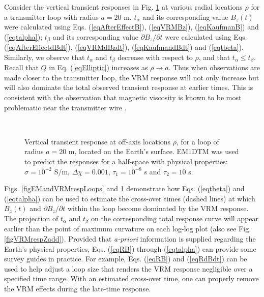 \documentclass[journal]{IEEEtran}  %
\begin{document}
Consider the vertical transient responses in Fig.
\ref{figEMandVRMrespOffAxis} at various radial locations $\rho$ for
a transmitter loop with radius $a=20$ m. $t_{\alpha}$ and its
corresponding value $B_z(t)$ were calculated using Eqs.
(\ref{eqAfterEffectB}), (\ref{eqVRMBz}), (\ref{eqKaufmanB}) and
(\ref{eqtalpha}); $t_{\beta}$ and its corresponding value $\partial
B_z/\partial t$ were calculated using Eqs.
(\ref{eqAfterEffectdBdt}), (\ref{eqVRMdBzdt}), (\ref{eqKaufmandBdt})
and (\ref{eqtbeta}). Similarly, we observe that $t_\alpha$ and
$t_\beta$ decrease with respect to $\rho$, and that $t_\alpha \leq
t_\beta$. Recall that $Q$ in Eq. (\ref{eqElliptic})
increases as $\rho \rightarrow a$. Thus when observations are made closer
to the transmitter loop, the VRM response will not only increase but will
also dominate the total observed transient response at earlier
times. This is consistent with the observation that magnetic
viscosity is known to be most problematic near the transmitter wire
\cite{Buselli1982,Lee1984,Barsukov2001}.

%
\begin{figure}[!t]
    \centering
    \\
    \vspace{-10pt}
    \caption{Vertical transient response at off-axis locations $\rho$,
    for a loop of radius $a=20$ m, located on the Earth's surface.
    EM1DTM was used to predict the responses for a half-space with
    physical properties: $\sigma=10^{-2}$ S/m, $\Delta \chi=0.001$, $\tau_1=10^{-8}$ s and $\tau_2=10$ s.}
    \label{figEMandVRMrespOffAxis}
\end{figure}
%

Figs. \ref{figEMandVRMrespLoops} and
\ref{figEMandVRMrespOffAxis} demonstrate how Eqs. (\ref{eqtbeta})
and (\ref{eqtalpha}) can be used to estimate the cross-over times
(dashed lines) at which $B_z (t)$ and $\partial B_z /\partial t$
within the loop become dominated by the VRM response. 
The projection of $t_\alpha$ and $t_\beta$ on the corresponding
total response curve will appear earlier than the point of maximum
curvature on each log-log plot (also see Fig. \ref{figVRMrespZadd}).
Provided that {\it a-priori} information is supplied regarding the
Earth's physical properties, Eqs. (\ref{eqRB}) through
(\ref{eqtalpha}) can provide some survey guides in practice. For
example, Eqs. (\ref{eqRB}) and (\ref{eqRdBdt}) can be used to help
adjust a loop size that renders the VRM response negligible over a
specified time range. With an
estimated cross-over time, one can properly remove the VRM effects
during the late-time response.
\end{document}

